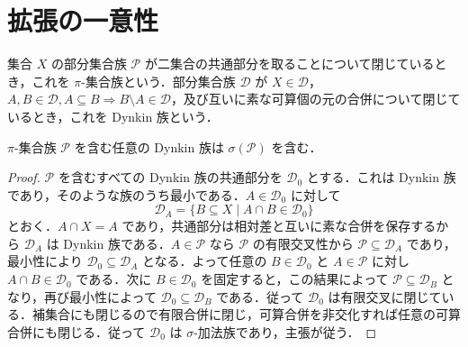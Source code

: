 \section{拡張の一意性}
\begin{defn}[π-集合族とDynkin族]
集合 $X$ の部分集合族 $\mathcal P$ が二集合の共通部分を取ることについて閉じているとき，これを $\pi$-集合族という．部分集合族 $\mathcal D$ が $X\in\mathcal D$，$A,B\in\mathcal D,A\subseteq B\Rightarrow B\setminus A\in\mathcal D$，及び互いに素な可算個の元の合併について閉じているとき，これを Dynkin 族という．
\end{defn}
\begin{prop}[π-λ定理]
$\pi$-集合族 $\mathcal P$ を含む任意の Dynkin 族は $\sigma(\mathcal P)$ を含む．
\end{prop}
\begin{proof}
$\mathcal P$ を含むすべての Dynkin 族の共通部分を $\mathcal D_0$ とする．これは Dynkin 族であり，そのような族のうち最小である．$A\in\mathcal D_0$ に対して
\[
 \mathcal D_A=\{B\subseteq X\mid A\cap B\in\mathcal D_0\}
\]
とおく．$A\cap X=A$ であり，共通部分は相対差と互いに素な合併を保存するから $\mathcal D_A$ は Dynkin 族である．$A\in\mathcal P$ なら $\mathcal P$ の有限交叉性から $\mathcal P\subseteq\mathcal D_A$ であり，最小性により $\mathcal D_0\subseteq\mathcal D_A$ となる．よって任意の $B\in\mathcal D_0$ と $A\in\mathcal P$ に対し $A\cap B\in\mathcal D_0$ である．次に $B\in\mathcal D_0$ を固定すると，この結果によって $\mathcal P\subseteq\mathcal D_B$ となり，再び最小性によって $\mathcal D_0\subseteq\mathcal D_B$ である．従って $\mathcal D_0$ は有限交叉に閉じている．補集合にも閉じるので有限合併に閉じ，可算合併を非交化すれば任意の可算合併にも閉じる．従って $\mathcal D_0$ は $\sigma$-加法族であり，主張が従う．
\end{proof}
